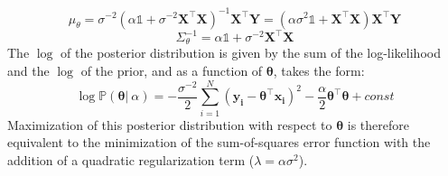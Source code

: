 \documentclass[twoside]{article}
\begin{document}
\begin{equation*}
    \mu_\theta = \sigma^{-2}(\alpha\mathds{1} + \sigma^{-2}\boldsymbol{X}^{\intercal}\boldsymbol{X})^{-1}\boldsymbol{X}^{\intercal}\boldsymbol{Y} = (\alpha\sigma^2\mathds{1} + \boldsymbol{X}^{\intercal}\boldsymbol{X})\boldsymbol{X}^{\intercal}\boldsymbol{Y}
\end{equation*}
\begin{equation*}
    \Sigma_\theta^{-1} = \alpha\mathds{1} + \sigma^{-2}\boldsymbol{X}^{\intercal}\boldsymbol{X}
\end{equation*}
The $\log$ of the posterior distribution is given by the sum of the log-likelihood and the $\log$ of the prior, and as a function of $\boldsymbol{\theta}$, takes the form:
\begin{equation*}
    \log\mathbb{P}(\boldsymbol{\theta}|\:\alpha) = -\frac{\sigma^{-2}}{2}\sum\limits_{i = 1}^{N}(\boldsymbol{y_i} - \boldsymbol{\theta}^{\intercal}\boldsymbol{x_i})^2 - \frac{\alpha}{2}\boldsymbol{\theta}^{\intercal}\boldsymbol{\theta} + const
\end{equation*}
Maximization of this posterior distribution with respect to $\boldsymbol{\theta}$ is therefore equivalent to the minimization of the sum-of-squares error function with the addition of a quadratic regularization term ($\lambda = \alpha\sigma^2$).
\end{document}
